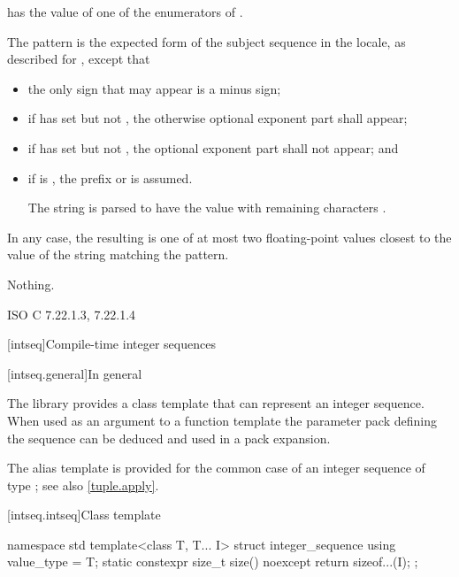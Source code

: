 \begin{itemdescr}
\pnum
\requires {} has the value of
one of the enumerators of .

\pnum
\effects The pattern is the expected form of the subject sequence
in the  locale,
as described for ,
except that
\begin{itemize}
\item
the only sign that may appear is a minus sign;
\item
if  has  set
but not ,
the otherwise optional exponent part shall appear;
\item
if  has  set
but not ,
the optional exponent part shall not appear; and
\item
if  is ,
the prefix  or  is assumed.
\begin{example}
The string 
is parsed to have the value
with remaining characters .
\end{example}
\end{itemize}
In any case, the resulting  is one of
at most two floating-point values
closest to the value of the string matching the pattern.

\pnum
\throws Nothing.
\end{itemdescr}

\xref ISO C 7.22.1.3, 7.22.1.4

[intseq]{Compile-time integer sequences}

[intseq.general]{In general}

\pnum
The library provides a class template that can represent an integer sequence.
When used as an argument to a function template the parameter pack defining the
sequence can be deduced and used in a pack expansion.
\begin{note}
The  alias template is provided for the common case of
an integer sequence of type ; see also \ref{tuple.apply}.
\end{note}

[intseq.intseq]{Class template }

%
\begin{codeblock}
namespace std {
  template<class T, T... I>
    struct integer_sequence {
      using value_type = T;
      static constexpr size_t size() noexcept { return sizeof...(I); }
    };
}
\end{codeblock}


